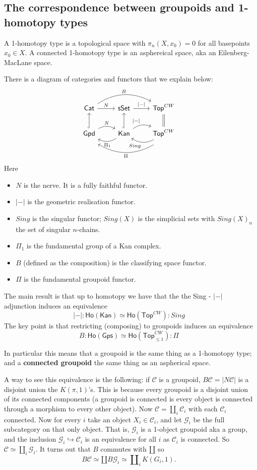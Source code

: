 \documentclass[11pt]{article}
\newcommand{\C}{\mathcal{C}}
\theoremstyle{definition}
\begin{document}
\subsection{The correspondence between groupoids and 1-homotopy types}

A 1-homotopy type is a topological space with $\pi_n(X,x_0)=0$ for all basepoints $x_0 \in X$. A connected 1-homotopy type is an asphereical space, aka an Eilenberg-MacLane space.


There is a diagram of categories and functors that we explain below:
$$\begin{tikzcd}
    \mathsf{Cat} \rar{N} \arrow[rr,bend left, "B"] & \mathsf{sSet} \rar{|-|} & \mathsf{Top}^{CW} \arrow[equals]{d} \\
  \mathsf{Gpd} \arrow[hook]{u}  \arrow[r,bend left, "N"]  & \mathsf{Kan}  \arrow[r,bend left, "|-|"]  \arrow[hook]{u} \arrow[l,bend left, "\Pi_1"] & \mathsf{Top}^{CW} \arrow[l,bend left, "Sing"] \arrow[ll,bend left, shift left=3, "\Pi"]
\end{tikzcd}$$
Here

\begin{itemize}
    \item $N$ is the nerve. It is a fully faithful functor.
    \item $|-|$ is the geometric realisation functor.
    \item $Sing$ is the singular functor; $Sing(X)$ is the simplicial sets with $Sing(X)_n$ the set of singular $n$-chains.
    \item $\Pi_1$ is the fundamental group of a Kan complex.
    \item  $B$ (defined as the composition) is the classifying space functor.
    \item $\Pi$ is the fundamental groupoid functor.
\end{itemize}


The main result is that up to homotopy we have that the the Sing - $|-|$ adjunction induces an equivalence $$ |-|:  \mathsf{Ho}(\mathsf{Kan}) \simeq \mathsf{Ho}(\mathsf{Top}^{CW}) : Sing$$
The key point is that restricting (composing) to groupoids induces an equivalence $$ B: \mathsf{Ho}(\mathsf{Gps}) \simeq \mathsf{Ho}(\mathsf{Top}^{CW}_{\leq 1}) : \Pi$$

In particular this means that a groupoid is the same thing as a 1-homotopy type; and a \textbf{connected groupoid }the same thing as an aspherical space.

A way to see this equivalence is the following: if $\C$ is a groupoid, $B \C = |N \C|$ is a disjoint union the $K(\pi,1)$'s. This is because every groupoid is a disjoint union of its connected components (a groupoid is connected is every object is connected through a morphism to every other object). Now $\C = \amalg_i \C_i$ with each $\C_i$ connected. Now for every $i$ take an object $X_i \in \C_i$, and let $\mathcal{G}_i$ be the full subcategory on that only object. That is, $\mathcal{G}_i$ is a 1-object groupoid aka a group, and the inclusion $\mathcal{G}_i \hookrightarrow \C_i$ is an equivalence for all $i$ as $\C_i$ is connected. So $\C \simeq \amalg_i \mathcal{G}_i$. It turns out that $B$ commutes with $\amalg$ so $$B \C \simeq \amalg B\mathcal{G}_i \simeq \amalg_i K(G_i,1 ).$$
\end{document}
